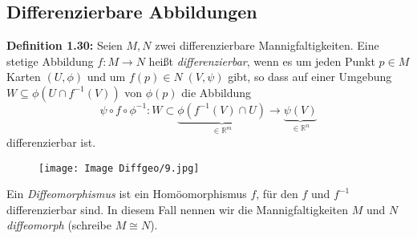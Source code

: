 \documentclass[fleqn, 12pt, letterpaper]{article}
\begin{document}
\subsection{Differenzierbare Abbildungen}

\textbf{Definition 1.30:} Seien $M, N$ zwei differenzierbare Mannigfaltigkeiten. Eine stetige Abbildung $f: M \to N$ heißt \emph{differenzierbar}, wenn es um jeden Punkt $p \in M$ Karten $(U,\phi)$ und um $f(p)\in N\; (V,\psi)$ gibt, so dass auf einer Umgebung $W \subseteq \phi(U \cap f^{-1}(V))$ von $\phi(p)$ die Abbildung
\[
  \psi\circ f\circ\phi^{-1}:W \subset\underbrace{\phi(f^{-1}(V)\cap U)}_{\in \mathbb{R}^m} \to \underbrace{\psi(V)}_{\in \mathbb{R}^n}
\]
differenzierbar ist.\\
\begin{figure}[H]
  \centering
  \texttt{[image: Image Diffgeo/9.jpg]}
\end{figure}

Ein \emph{Diffeomorphismus} ist ein Homöomorphismus $f$, für den $f$ und $f^{-1}$ differenzierbar sind. In diesem Fall nennen wir die Mannigfaltigkeiten $M$ und $N$ \emph{diffeomorph} (schreibe $M \cong N$).\\
\end{document}
